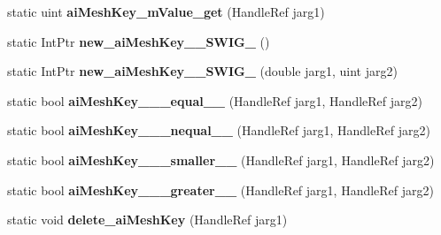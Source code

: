 \begin{DoxyCompactItemize}
\item 
\hypertarget{class_assimp_p_i_n_v_o_k_e_a60abba44f7b953cebc6b359191f5af39}{static uint {\bfseries ai\+Mesh\+Key\+\_\+m\+Value\+\_\+get} (Handle\+Ref jarg1)}\label{class_assimp_p_i_n_v_o_k_e_a60abba44f7b953cebc6b359191f5af39}

\item 
\hypertarget{class_assimp_p_i_n_v_o_k_e_a4f15ddfb4569cef3c6b3ca547f52df60}{static Int\+Ptr {\bfseries new\+\_\+ai\+Mesh\+Key\+\_\+\+\_\+\+S\+W\+I\+G\+\_} ()}\label{class_assimp_p_i_n_v_o_k_e_a4f15ddfb4569cef3c6b3ca547f52df60}

\item 
\hypertarget{class_assimp_p_i_n_v_o_k_e_ac92798d8b3a20122eb08862527f30097}{static Int\+Ptr {\bfseries new\+\_\+ai\+Mesh\+Key\+\_\+\+\_\+\+S\+W\+I\+G\+\_} (double jarg1, uint jarg2)}\label{class_assimp_p_i_n_v_o_k_e_ac92798d8b3a20122eb08862527f30097}

\item 
\hypertarget{class_assimp_p_i_n_v_o_k_e_a5a41c243a1e64d41d412d786569e252e}{static bool {\bfseries ai\+Mesh\+Key\+\_\+\+\_\+\+\_\+equal\+\_\+\+\_\+} (Handle\+Ref jarg1, Handle\+Ref jarg2)}\label{class_assimp_p_i_n_v_o_k_e_a5a41c243a1e64d41d412d786569e252e}

\item 
\hypertarget{class_assimp_p_i_n_v_o_k_e_a12151e1315a100b3e5b0742f94ad027a}{static bool {\bfseries ai\+Mesh\+Key\+\_\+\+\_\+\+\_\+nequal\+\_\+\+\_\+} (Handle\+Ref jarg1, Handle\+Ref jarg2)}\label{class_assimp_p_i_n_v_o_k_e_a12151e1315a100b3e5b0742f94ad027a}

\item 
\hypertarget{class_assimp_p_i_n_v_o_k_e_a2f6968b356ed1af6348f028ba5928395}{static bool {\bfseries ai\+Mesh\+Key\+\_\+\+\_\+\+\_\+smaller\+\_\+\+\_\+} (Handle\+Ref jarg1, Handle\+Ref jarg2)}\label{class_assimp_p_i_n_v_o_k_e_a2f6968b356ed1af6348f028ba5928395}

\item 
\hypertarget{class_assimp_p_i_n_v_o_k_e_ab182cd80968833e7c98909890764abd6}{static bool {\bfseries ai\+Mesh\+Key\+\_\+\+\_\+\+\_\+greater\+\_\+\+\_\+} (Handle\+Ref jarg1, Handle\+Ref jarg2)}\label{class_assimp_p_i_n_v_o_k_e_ab182cd80968833e7c98909890764abd6}

\item 
\hypertarget{class_assimp_p_i_n_v_o_k_e_aa8f171a47951036a8acf3f1c1ded5e0c}{static void {\bfseries delete\+\_\+ai\+Mesh\+Key} (Handle\+Ref jarg1)}\label{class_assimp_p_i_n_v_o_k_e_aa8f171a47951036a8acf3f1c1ded5e0c}


\end{DoxyCompactItemize}
